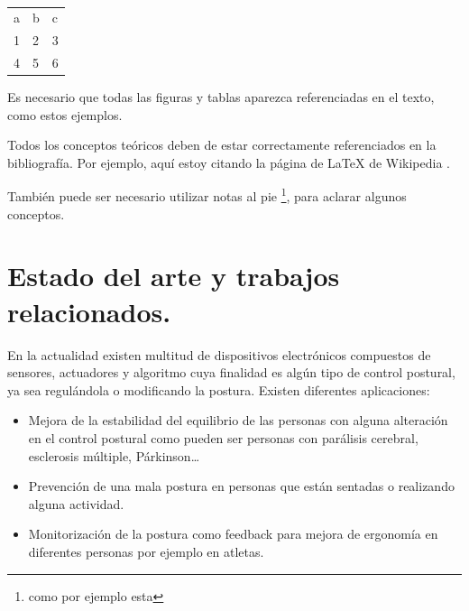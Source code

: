 \begin{table}[]
\begin{tabular}{lll}
a & b & c \\
1 & 2 & 3 \\
4 & 5 & 6
\end{tabular}
\caption{}
\label{tab:my-table}
\end{table}

Es necesario que todas las figuras y tablas aparezca referenciadas en el texto, como estos ejemplos.

Todos los conceptos teóricos deben de estar correctamente referenciados en la bibliografía. Por ejemplo, aquí estoy citando la página de \LaTeX{} de Wikipedia \cite{wiki:latex}. %

También puede ser necesario utilizar notas al pie \footnote{como por ejemplo esta}, para aclarar algunos conceptos.


\section{Estado del arte y trabajos relacionados.}

En la actualidad existen multitud de dispositivos electrónicos compuestos de sensores, actuadores y algoritmo cuya finalidad es algún tipo de control postural, ya sea regulándola o modificando la postura. Existen diferentes aplicaciones: 
\begin{itemize}
    \item Mejora de la estabilidad del equilibrio de las personas con alguna alteración en el control postural como pueden ser personas con parálisis cerebral, esclerosis múltiple, Párkinson… 

    \item Prevención de una mala postura en personas que están sentadas o realizando alguna actividad. 

    \item Monitorización de la postura como feedback para mejora de ergonomía en diferentes personas por ejemplo en atletas. 
\end{itemize}

